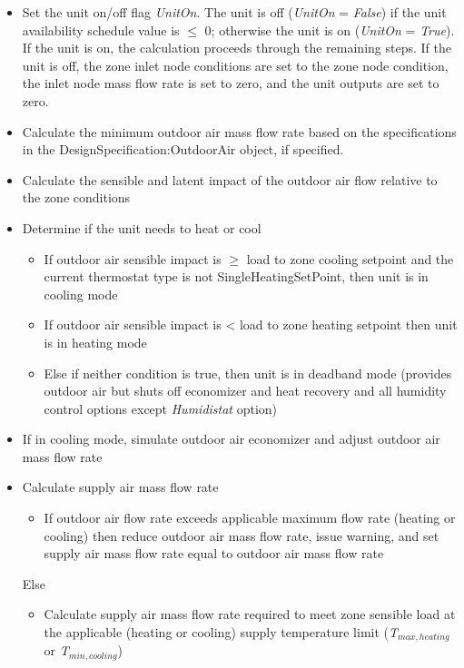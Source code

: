 \begin{itemize}
  \item Set the unit on/off flag \emph{UnitOn}. The unit is off (\emph{UnitOn} = \emph{False}) if the unit availability schedule value is \(\leq\) 0; otherwise the unit is on (\emph{UnitOn} = \emph{True}). If the unit is on, the calculation proceeds through the remaining steps. If the unit is off, the zone inlet node conditions are set to the zone node condition, the inlet node mass flow rate is set to zero, and the unit outputs are set to zero.
  \item Calculate the minimum outdoor air mass flow rate based on the specifications in the DesignSpecification:OutdoorAir object, if specified.
  \item Calculate the sensible and latent impact of the outdoor air flow relative to the zone conditions
  \item Determine if the unit needs to heat or cool 
    \begin{itemize}
      \item If outdoor air sensible impact is \(\geq\) load to zone cooling setpoint and the current thermostat type is not SingleHeatingSetPoint, then unit is in cooling mode
      \item If outdoor air sensible impact is \textless{} load to zone heating setpoint then unit is in heating mode
      \item Else if neither condition is true, then unit is in deadband mode (provides outdoor air but shuts off economizer and heat recovery and all humidity control options except \emph{Humidistat} option) 
    \end{itemize}
  \item If in cooling mode, simulate outdoor air economizer and adjust outdoor air mass flow rate
  \item Calculate supply air mass flow rate 

    \begin{itemize}
      \item If outdoor air flow rate exceeds applicable maximum flow rate (heating or cooling) then reduce outdoor air mass flow rate, issue warning, and set supply air mass flow rate equal to outdoor air mass flow rate
    \end{itemize}

    Else

    \begin{itemize}
      \item Calculate supply air mass flow rate required to meet zone sensible load at the applicable (heating or cooling) supply temperature limit (\emph{T\(_{max,heating}\)} or \emph{T\(_{min,cooling}\)})


\end{itemize}
\end{itemize}
